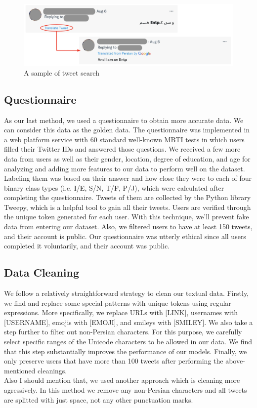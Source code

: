 \documentclass[10pt, a4paper]{article}
\begin{document}
\begin{figure}[h]
    \centering
    \includegraphics[width=.95\columnwidth]{images/sample-tweet.png}
    \caption{A sample of tweet search}
    \label{tweet_figure}
\end{figure}

\subsection{Questionnaire}
As our last method, we used a questionnaire to obtain more accurate data.
We can consider this data as the golden data.
The questionnaire was implemented in a web platform service with 60 standard well-known MBTI tests in which users
filled their Twitter IDs and answered those questions. We received a
few more data from users as well as their gender, location, degree of education,
and age for analyzing and adding more features to our data to perform well on the dataset.
Labeling them was based on their answer and how close they were to each of four binary class types (i.e. I/E, S/N, T/F, P/J),
which were calculated after completing the questionnaire.
Tweets of them are collected by the Python library Tweepy, which is a helpful tool to gain all their tweets.
Users are verified through the unique token generated for each user.
With this technique, we'll prevent fake data from entering our dataset.
Also, we filtered users to have at least 150 tweets, and their account is public.
Our questionnaire was utterly ethical since all users completed it voluntarily, and their account was public.

\subsection{Data Cleaning}
We follow a relatively straightforward strategy to clean our textual data.
Firstly, we find and replace some special patterns with unique tokens using regular expressions.
More specifically, we replace URLs with [LINK], usernames with [USERNAME], emojis with [EMOJI], and smileys with [SMILEY].
We also take a step further to filter out non-Persian characters.
For this purpose, we carefully select specific ranges of the Unicode characters to be allowed in our data.
We find that this step substantially improves the performance of our models.
Finally, we only preserve users that have more than 100 tweets after performing the above-mentioned cleanings.
\\
Also I should mention that, we used another approach which is cleaning more agressively. In this method we remove any non-Persian
characters and all tweets are splitted with just space, not any other punctuation marks.
\end{document}
